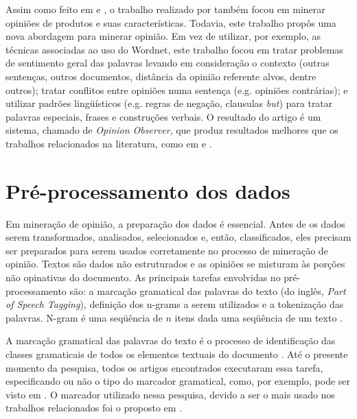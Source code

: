 \documentclass[template.tex]{subfiles}
\begin{document}
Assim como feito em  e , o trabalho realizado por  também focou em minerar opiniões de produtos e suas características. Todavia, este trabalho propôs uma nova abordagem para minerar opinião. Em vez de utilizar, por exemplo, as técnicas associadas ao uso do Wordnet, este trabalho focou em tratar problemas de sentimento geral das palavras levando em consideração o contexto (outras sentenças, outros documentos, distância da opinião referente alvos, dentre outros); tratar conflitos entre opiniões numa sentença (e.g. opiniões contrárias); e utilizar padrões lingüísticos (e.g. regras de negação, clausulas \textit{but}) para tratar palavras especiais, frases e construções verbais. O resultado do artigo é um sistema, chamado de \textit{Opinion Observer}, que produz resultados melhores que os trabalhos relacionados na literatura, como em  e  .

\section{Pré-processamento dos dados}

Em mineração de opinião, a preparação dos dados é essencial. Antes de os dados serem transformados, analisados, selecionados e, então, classificados, eles precisam ser preparados para serem usados corretamente no processo de mineração de opinião. Textos são dados não estruturados e as opiniões se misturam às porções não opinativas do documento. As principais tarefas envolvidas no pré-processamento são: a marcação gramatical das palavras do texto (do inglês, \textit{Part of Speech Tagging}), definição dos n-grams a serem utilizados e a tokenização das palavras. N-gram é uma seqüência de $n$ itens dada uma seqüência de um texto \cite{dave2003mining}. 

A marcação gramatical das palavras do texto é o processo de identificação das classes gramaticais de todos os elementos textuais do documento \cite{brill1995transformation}. Até o presente momento da pesquisa, todos os artigos encontrados executaram essa tarefa, especificando ou não o tipo do marcador gramatical, como, por exemplo, pode ser visto em . O marcador utilizado nessa pesquisa, devido a ser o mais usado nos trabalhos relacionados foi o proposto em .
\end{document}
